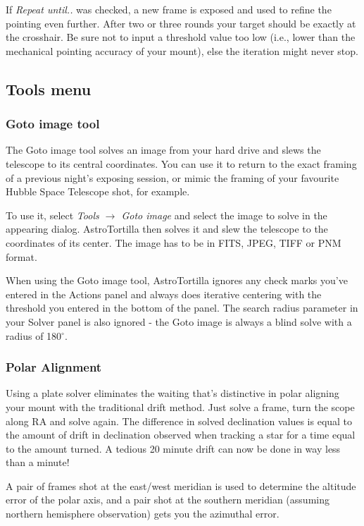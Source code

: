 \documentclass[english]{article}
\begin{document}
If \emph{Repeat until..} was checked, a new frame is exposed and used to refine the pointing 
even further. After two or three rounds your target should be exactly at the crosshair.
Be sure not to input a threshold value too low (i.e., lower than the mechanical pointing accuracy of your mount),
else the iteration might never stop.

\subsection{Tools menu}
\subsubsection{Goto image tool}

The Goto image tool solves an image from your hard drive and slews the
telescope to its central coordinates. You can use it to return to the exact
framing of a previous night's exposing session, or mimic the framing of your
favourite Hubble Space Telescope shot, for example.

To use it, select \emph{Tools $\rightarrow$ Goto image} and select the image to
solve in the appearing dialog.  AstroTortilla then solves it and slew the
telescope to the coordinates of its center. The image has to be in FITS, JPEG,
TIFF or PNM format.

When using the Goto image tool, AstroTortilla ignores any check marks you've
entered in the Actions panel and always does iterative centering with the
threshold you entered in the bottom of the panel. The search radius parameter in
your Solver panel is also ignored - the Goto image is always a blind solve with a radius of 180$^\circ$.

\subsubsection{Polar Alignment}

Using a plate solver eliminates the waiting that's distinctive in polar aligning 
your mount with the traditional drift method. Just solve a frame, turn the scope 
along RA and solve again. The difference in solved declination values is equal 
to the amount of drift in declination observed when tracking a star for a time 
equal to the amount turned. A tedious 20 minute drift can now be done in way less than a minute!

A pair of frames shot at the east/west meridian is used to determine the
altitude error of the polar axis, and a pair shot at the southern meridian
(assuming northern hemisphere observation) gets you the azimuthal error.
\end{document}
